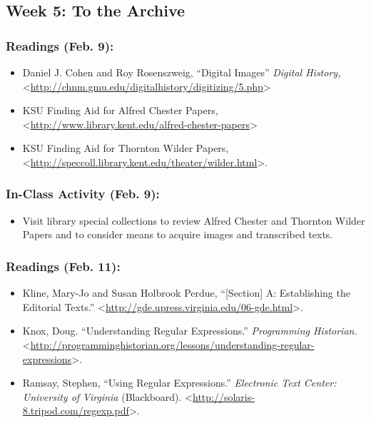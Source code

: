 \documentclass[]{article}
\begin{document}
\subsection{Week 5: To the Archive}\label{week-5-to-the-archive}

\subsubsection{Readings (Feb. 9):}\label{readings-feb.-9}

\begin{itemize}
\itemsep1pt\parskip0pt
\item
  Daniel J. Cohen and Roy Rosenszweig, ``Digital Images'' \emph{Digital
  History,}
  \textless{}\url{http://chnm.gmu.edu/digitalhistory/digitizing/5.php}\textgreater{}
\item
  KSU Finding Aid for Alfred Chester Papers,
  \textless{}\url{http://www.library.kent.edu/alfred-chester-papers}\textgreater{}
\item
  KSU Finding Aid for Thornton Wilder Papers,
  \textless{}\url{http://speccoll.library.kent.edu/theater/wilder.html}\textgreater{}.
\end{itemize}

\subsubsection{In-Class Activity (Feb.
9):}\label{in-class-activity-feb.-9}

\begin{itemize}
\itemsep1pt\parskip0pt
\item
  Visit library special collections to review Alfred Chester and
  Thornton Wilder Papers and to consider means to acquire images and
  transcribed texts.
\end{itemize}

\subsubsection{Readings (Feb. 11):}\label{readings-feb.-11}

\begin{itemize}
\itemsep1pt\parskip0pt
\item
  Kline, Mary-Jo and Susan Holbrook Perdue, ``{[}Section{]} A:
  Establishing the Editorial Texts.''
  \textless{}\url{http://gde.upress.virginia.edu/06-gde.html}\textgreater{}.
\item
  Knox, Doug. ``Understanding Regular Expressions.'' \emph{Programming
  Historian.}
  \textless{}\url{http://programminghistorian.org/lessons/understanding-regular-expressions}\textgreater{}.
\item
  Ramsay, Stephen, ``Using Regular Expressions.'' \emph{Electronic Text
  Center: University of Virginia} (Blackboard).
  \textless{}\url{http://solaris-8.tripod.com/regexp.pdf}\textgreater{}.
\end{itemize}
\end{document}
